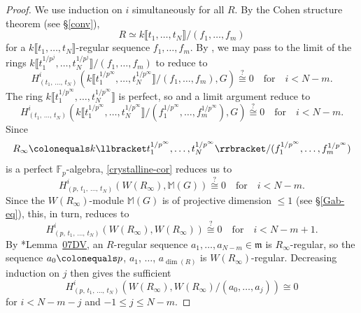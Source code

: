\documentclass[11pt, reqno]{amsart}
\newcommand{\temp}[1]{{\color{Gray} {\footnotesize  #1 }}}			%
\newcommand{\bF}{\mathbb{F}}
\newcommand{\bM}{\mathbb{M}}
\newcommand{\fm}{\mathfrak{m}}
\newcommand{\ce}{\colonequals}
\newcommand{\fppf}{\mathrm{fppf}}		%
\newcommand{\isomto}{\overset{\sim}{\longrightarrow}}
\newcommand{\llb}{\llbracket}			%
\newcommand{\rrb}{\rrbracket}			%
\newcommand{\syn}{\mathrm{syn}}		%
\newcommand{\blem}{\begin{lemma}}
\newcommand{\elem}{\end{lemma}}
\providecommand{\qxq}[1]{\quad\text{#1}\quad}
\newcommand{\be}{\begin{equation}}
\newcommand{\ee}{\end{equation}}
\newcommand{\bpf}{\begin{proof}}
\newcommand{\epf}{\end{proof}}
\numberwithin{equation}{numberingbase}
\theoremstyle{thms}
\newtheorem{lemma}[numberingbase]{Lemma}
\theoremstyle{claims}
\theoremstyle{defs}
\theoremstyle{thms}
\theoremstyle{defs}
\theoremstyle{subsection-tweak}
\theoremstyle{subsection-tweak}
\begin{document}
\bpf
We use induction on $i$ simultaneously for all $R$. By the Cohen structure theorem (see \S\ref{conv}), 
\[
R \simeq k\llb t_1, \dotsc, t_N \rrb/(f_1, \dotsc, f_m)
\]
for a $k\llb t_1, \dotsc, t_N \rrb$-regular sequence $f_1, \dotsc, f_m$. By , %
we may pass to the limit of the rings $k\llb t_1^{1/p^j}, \dotsc, t_N^{1/p^j} \rrb/(f_1, \dotsc, f_m)$ %
to reduce to
\[
H^i_{(t_1,\, \dotsc,\, t_N)}(k\llb t_1^{1/p^{\infty}}, \dotsc, t_N^{1/p^{\infty}} \rrb/(f_1, \dotsc, f_m), G) \overset{?}{\cong} 0 \qxq{for} i < N - m.
\]
The ring $k\llb t_1^{1/p^\infty}, \dotsc, t_N^{1/p^\infty} \rrb$ is perfect, so %
 and a limit argument reduce to 
\[%
H^i_{(t_1,\, \dotsc,\, t_N)}(k\llb t_1^{1/p^{\infty}}, \dotsc, t_N^{1/p^{\infty}} \rrb/(f_1^{1/p^{\infty}}, \dotsc, f_m^{1/p^{\infty}}), G) \overset{?}{\cong} 0 \qxq{for} i < N - m.
\]%
Since 
\[
R_\infty \ce k\llb t_1^{1/p^{\infty}}, \dotsc, t_N^{1/p^{\infty}} \rrb/(f_1^{1/p^{\infty}}, \dotsc, f_m^{1/p^{\infty}})
\]
is a perfect $\bF_p$-algebra, \eqref{crystalline-cor} reduces us to
\[
H^i_{(p,\, t_1,\, \dotsc,\, t_N)}(W(R_\infty), \bM(G)) \overset{?}{\cong} 0 \qxq{for} i < N - m. 
\] 
Since the $W(R_\infty)$-module $\bM(G)$ is of projective dimension $\le 1$ (see \S\ref{Gab-eq}), this, in turn, reduces to 
\[
H^i_{(p,\, t_1,\, \dotsc,\, t_N)}(W(R_\infty), W(R_\infty)) \overset{?}{\cong} 0 \qxq{for} i < N - m + 1. %
\] 
By \cite{SP}*{Lemma~\href{https://stacks.math.columbia.edu/tag/07DV}{07DV}}, an $R$-regular sequence $a_1, \dotsc, a_{N - m} \in \fm$ is $R_\infty$-regular, so the sequence $a_0 \ce p$, $a_1$, $\dotsc$, $a_{\dim(R)}$ is $W(R_\infty)$-regular. Decreasing induction on $j$ then gives the sufficient
\[
H^i_{(p,\, t_1,\, \dotsc,\, t_N)}(W(R_\infty), W(R_\infty)/(a_0, \dotsc, a_j)) \cong 0 
\]
for $i < N - m - j$ and $-1 \le j \le N - m$.
\epf








\end{document}

